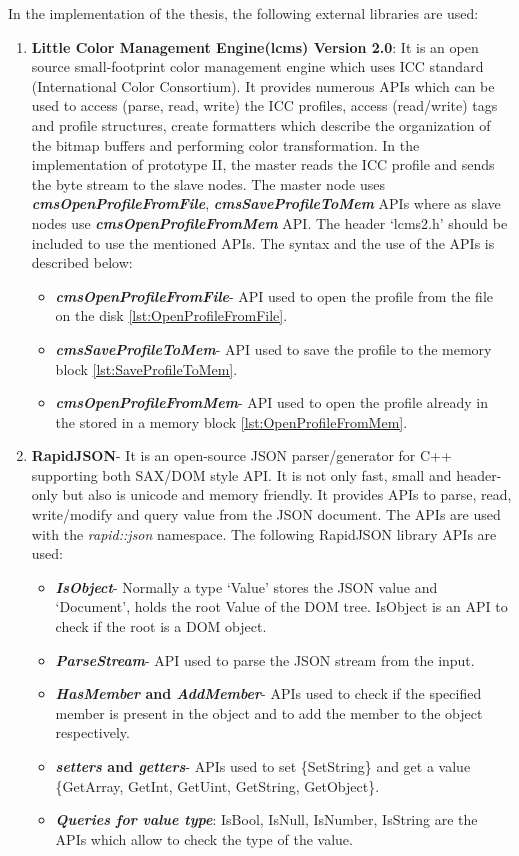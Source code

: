 In the implementation of the thesis, the following external libraries are used:    
\begin{enumerate}
\item \textbf{Little Color Management Engine(lcms) Version 2.0}: It is an open source small-footprint color management engine which uses ICC standard (International Color Consortium). It provides numerous APIs which can be used to access (parse, read, write) the ICC profiles, access (read/write) tags and profile structures, create formatters which describe the organization of the bitmap buffers and performing color transformation.  In the implementation of prototype II, the master reads the ICC profile  and sends the byte stream to the slave nodes. The master node uses \textbf{\textit{cmsOpenProfileFromFile}}, \textbf{\textit{cmsSaveProfileToMem}} APIs where as slave nodes use \textit{\textbf{cmsOpenProfileFromMem}} API. The header {\lq}lcms2.h{\rq} should be included to use the mentioned APIs. The syntax and the use of the APIs is described below:

\begin{itemize}
\item \textbf{\textit{cmsOpenProfileFromFile}}- API used to open the profile from the file on the disk \ref{lst:OpenProfileFromFile}.
\item \textbf{\textit{cmsSaveProfileToMem}}- API used to save the profile to the memory block \ref{lst:SaveProfileToMem}. 
\item \textbf{\textit{cmsOpenProfileFromMem}}- API used to open the profile already in the stored in a memory block \ref{lst:OpenProfileFromMem}. 
\end{itemize} 

\item \textbf{RapidJSON}- It is an open-source JSON parser/generator for C++ supporting both SAX/DOM style API. It is not only fast, small and header-only but also is unicode and memory friendly. It provides APIs to parse, read, write/modify and query value from the JSON document. The APIs are used with the \textit{rapid::json } namespace. The following RapidJSON library APIs are used:
\begin{itemize}
\item \textbf{\textit{IsObject}}- Normally a type {\lq}Value{\rq} stores the JSON value and {\lq}Document{\rq}, holds the root Value of the DOM tree. IsObject is an API to check if the root is a DOM object.
\item \textbf{\textit{ParseStream}}- API used to parse the JSON stream from the input.
\item \textbf{\textit{HasMember} and \textit{AddMember}}- APIs used to check if the specified member is present in the object and to add the member to the object respectively. 
\item \textbf{\textit{setters} and \textit{getters}}- APIs used to set \{SetString\} and get a value \{GetArray, GetInt, GetUint, GetString, GetObject\}.
\item \textbf{\textit{Queries for value type}}: IsBool, IsNull, IsNumber, IsString are the APIs which allow to check the type of the value. 
\end{itemize} 
  

\end{enumerate}
